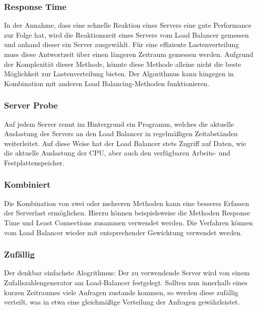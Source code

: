 \documentclass[letterpaper, 12pt]{article}
\let\tempsubsubsection\subsubsection
\renewcommand\subsubsection[1]{\vspace{0cm}\tempsubsubsection{#1}\vspace{0cm}}
\begin{document}
\subsubsection{Response Time}

In der Annahme, dass eine schnelle Reaktion eines Servers eine gute Performance zur Folge hat,
wird die Reaktionszeit eines Servers vom Load Balancer gemessen und anhand dieser ein Server
ausgewählt. Für eine effiziente Lastenverteilung muss diese Antwortzeit über einen längeren Zeitraum gemessen werden. Aufgrund der Komplexität dieser Methode, könnte diese Methode alleine nicht die beste Möglichkeit
zur Lastenverteilung bieten. Der Algorithmus kann hingegen in Kombination mit anderen
Load Balancing-Methoden funktionieren. \cite{ausarbeitunglb}

\subsubsection{Server Probe}

Auf jedem Server rennt im Hintergrund ein Programm, welches die aktuelle Auslastung des Servers
an den Load Balancer in regelmäßigen Zeitabständen weiterleitet. Auf diese Weise hat der Load
Balancer stets Zugriff auf Daten, wie die aktuelle Auslastung der CPU, aber auch den verfügbaren
Arbeits- und Festplattenspeicher. \cite{ausarbeitunglb}

\subsubsection{Kombiniert}

Die Kombination von zwei oder mehreren Methoden kann eine besseres Erfassen der Serverlast
ermöglichen. Hierzu können beispielsweise die Methoden Response Time und Least Connections
zusammen verwendet werden. Die Verfahren können vom Load Balancer wieder mit entsprechender
Gewichtung verwendet werden. \cite{ausarbeitunglb}

\subsubsection{Zufällig}

Der denkbar einfachste Alogrithmus: Der zu verwendende Server wird von einem Zufallszahlengenerator am Load-Balancer festgelegt.
Sollten nun innerhalb eines kurzen Zeitraumes viele Anfragen zustande kommen, so werden diese
zufällig verteilt, was in etwa eine gleichmäßige Verteilung der Anfragen gewährleistet. \cite{ausarbeitunglb}
\end{document}
